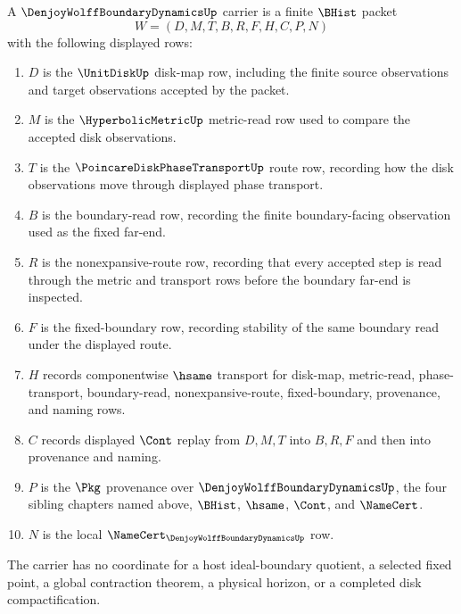 \begin{definition}
\label{def:denjoy-wolff-boundary-dynamics-carrier}
A $\DenjoyWolffBoundaryDynamicsUp$ carrier is a finite $\BHist$ packet
$$
W=(D,M,T,B,R,F,H,C,P,N)
$$
with the following displayed rows:
\begin{enumerate}
\item $D$ is the $\UnitDiskUp$ disk-map row, including the finite source observations and target observations accepted by the packet.
\item $M$ is the $\HyperbolicMetricUp$ metric-read row used to compare the accepted disk observations.
\item $T$ is the $\PoincareDiskPhaseTransportUp$ route row, recording how the disk observations move through displayed phase transport.
\item $B$ is the boundary-read row, recording the finite boundary-facing observation used as the fixed far-end.
\item $R$ is the nonexpansive-route row, recording that every accepted step is read through the metric and transport rows before the boundary far-end is inspected.
\item $F$ is the fixed-boundary row, recording stability of the same boundary read under the displayed route.
\item $H$ records componentwise $\hsame$ transport for disk-map, metric-read, phase-transport, boundary-read, nonexpansive-route, fixed-boundary, provenance, and naming rows.
\item $C$ records displayed $\Cont$ replay from $D,M,T$ into $B,R,F$ and then into provenance and naming.
\item $P$ is the $\Pkg$ provenance over $\DenjoyWolffBoundaryDynamicsUp$, the four sibling chapters named above, $\BHist$, $\hsame$, $\Cont$, and $\NameCert$.
\item $N$ is the local $\NameCert_{\DenjoyWolffBoundaryDynamicsUp}$ row.
\end{enumerate}
The carrier has no coordinate for a host ideal-boundary quotient, a selected fixed point, a global contraction theorem, a physical horizon, or a completed disk compactification.
\end{definition}

